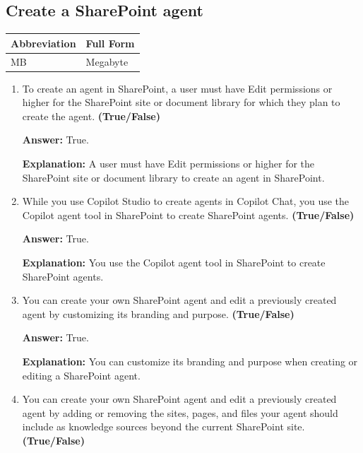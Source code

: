 \documentclass[10pt]{article}
\begin{document}
\clearpage
\subsection{Create a SharePoint agent}

\begin{center}
\begin{tabular}{>{\raggedright\arraybackslash}p{} >{\raggedright\arraybackslash}p{}}
\toprule
\textbf{Abbreviation} & \textbf{Full Form} \\
\midrule
MB & Megabyte \\
\bottomrule
\end{tabular}
\end{center}

\begin{enumerate}[leftmargin=*]

\item To create an agent in SharePoint, a user must have Edit permissions or higher for the SharePoint site or document library for which they plan to create the agent. \textbf{(True/False)}

\textbf{Answer:} True.

\textbf{Explanation:} A user must have Edit permissions or higher for the SharePoint site or document library to create an agent in SharePoint.

\item While you use Copilot Studio to create agents in Copilot Chat, you use the Copilot agent tool in SharePoint to create SharePoint agents. \textbf{(True/False)}

\textbf{Answer:} True.

\textbf{Explanation:} You use the Copilot agent tool in SharePoint to create SharePoint agents.

\item You can create your own SharePoint agent and edit a previously created agent by customizing its branding and purpose. \textbf{(True/False)}

\textbf{Answer:} True.

\textbf{Explanation:} You can customize its branding and purpose when creating or editing a SharePoint agent.

\item You can create your own SharePoint agent and edit a previously created agent by adding or removing the sites, pages, and files your agent should include as knowledge sources beyond the current SharePoint site. \textbf{(True/False)}


\end{enumerate}
\end{document}
